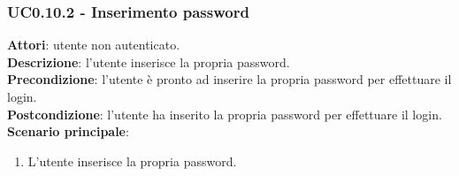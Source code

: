 	\subsubsection{UC0.10.2 - Inserimento password}{
		\label{uc0.10.2}
		\textbf{Attori}: utente non autenticato. \\
		\textbf{Descrizione}: l'utente  inserisce la propria password.	\\
		\textbf{Precondizione}: l'utente  è pronto ad inserire la propria password per effettuare il login.	\\
		\textbf{Postcondizione}: l'utente  ha inserito la propria password per effettuare il login.	\\
		\textbf{Scenario principale}:
		\begin{enumerate}
			\item L'utente inserisce la propria password.
		\end{enumerate}
		}